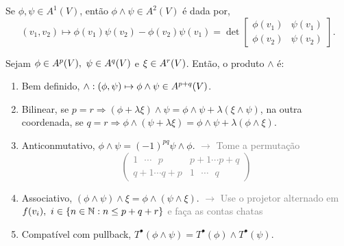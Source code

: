 \begin{example}
    Se \(\phi, \psi \in A^1(V)\), então \(\phi \wedge \psi \in A^2(V)\) é dada por,
    \[(v_1, v_2) \mapsto \phi(v_1)\psi(v_2) - \phi(v_2)\psi(v_1) =\det  \begin{bmatrix}
        \phi(v_1) & \psi(v_1) \\ 
        \phi(v_2) & \psi(v_2) 
    \end{bmatrix}.\] 
\end{example}


\begin{proposition}
    Sejam \(\phi \in A^p(V),\ \psi \in A^q(V)\) e \(\xi \in A^r(V)\). Então, o produto \(\wedge\) é:   
    \begin{enumerate}[label = \roman*.]
        \item Bem definido, \(\wedge:  (\phi, \psi )\mapsto \phi \wedge \psi \in A^{p+q}(V)\).   
        \item Bilinear, se \(p = r \Rightarrow (\phi + \lambda \xi) \wedge \psi =  \phi \wedge \psi + \lambda (\xi \wedge \psi)\), na outra coordenada, se \(q = r \Rightarrow \phi  \wedge (\psi+ \lambda \xi) =  \phi \wedge \psi + \lambda (\phi \wedge \xi) \). %
        \item Anticonmutativo, \(\phi \wedge \psi =  (-1)^{pq} \psi \wedge \phi\). \textcolor{gray}{\(\rightarrow \) Tome a permutação \[\begin{pmatrix}
    1\ \ \ \cdots \ \ \  p & p+1  \cdots  p+q\\ 
    q+ 1 \cdots  q+p & 1 \ \ \  \cdots \ \ \  q
\end{pmatrix}\] }
\vspace{-0.6cm}
        \item Associativo, \((\phi \wedge \psi) \wedge \xi = \phi \wedge (\psi \wedge \xi)\). \textcolor{gray}{\(\rightarrow \) Use o projetor alternado em \(f(v_i), \ i \in \{n\in \mathbb{N} : n\leq p+q+r\}\) e faça as contas chatas}
        \item Compatível com pullback, \(T^{\bullet}(\phi \wedge \psi) = T^{\bullet}(\phi) \wedge T^{\bullet }(\psi)\).   
    \end{enumerate} 
\end{proposition}

